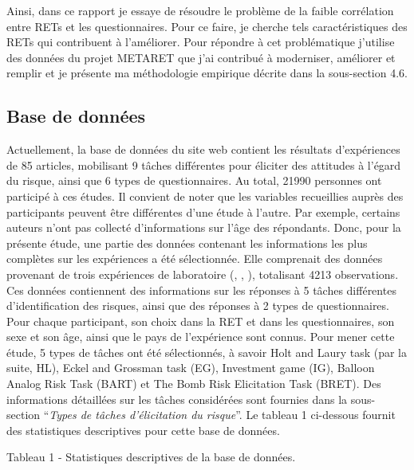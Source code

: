 \documentclass[12pt]{article}
\begin{document}
Ainsi, dans ce rapport je essaye de résoudre le problème de la faible
corrélation entre RETs et les questionnaires. Pour ce faire, je cherche
tels caractéristiques des RETs qui contribuent à l'améliorer. Pour
répondre à cet problématique j'utilise des données du projet METARET que
j'ai contribué à moderniser, améliorer et remplir et je présente ma
méthodologie empirique décrite dans la sous-section 4.6.

\subsection{Base de données}

Actuellement, la base de données du site web contient les résultats
d'expériences de 85 articles, mobilisant 9 tâches différentes pour
éliciter des attitudes à l'égard du risque, ainsi que 6 types de
questionnaires. Au total, 21990 personnes ont participé à ces études. Il
convient de noter que les variables recueillies auprès des participants
peuvent être différentes d'une étude à l'autre. Par exemple, certains
auteurs n'ont pas collecté d'informations sur l'âge des répondants.
Donc, pour la présente étude, une partie des données contenant les
informations les plus complètes sur les expériences a été sélectionnée.
Elle comprenait des données provenant de trois expériences de
laboratoire (\citet{Crosetto2013}, \citet{Crosetto2016},
\citet{Frey2017}), totalisant 4213 observations. Ces données contiennent
des informations sur les réponses à 5 tâches différentes
d'identification des risques, ainsi que des réponses à 2 types de
questionnaires. Pour chaque participant, son choix dans la RET et dans
les questionnaires, son sexe et son âge, ainsi que le pays de
l'expérience sont connus. Pour mener cette étude, 5 types de tâches ont
été sélectionnés, à savoir Holt and Laury task (par la suite, HL), Eckel
and Grossman task (EG), Investment game (IG), Balloon Analog Risk Task
(BART) et The Bomb Risk Elicitation Task (BRET). Des informations
détaillées sur les tâches considérées sont fournies dans la sous-section
``\emph{Types de tâches d'élicitation du risque}''. Le tableau 1
ci-dessous fournit des statistiques descriptives pour cette base de
données.

Tableau 1 - Statistiques descriptives de la base de données.
\end{document}
